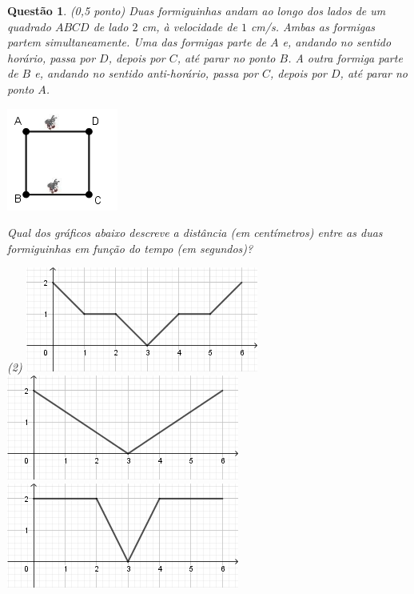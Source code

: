 \documentclass[oneside,a4paper,12pt]{article}
\newcommand{\negrito}[1]{\mbox{\boldmath{$#1$}}}
\theoremstyle{Colorido}
\theoremstyle{solu}
\theoremstyle{dotlessP}
\newtheorem{sol}{Questão}
\begin{document}
	\begin{sol}
\textit{(0,5 ponto)} \newline \newline Duas formiguinhas andam ao longo dos lados de um quadrado $ABCD$ de lado $2$ cm, à velocidade de $1$ cm/s. Ambas as formigas partem simultaneamente. Uma das formigas parte de $A$ e, andando no sentido horário, passa por $D$, depois por $C$, até parar no ponto $B$. A outra formiga parte de $B$ e, andando no sentido anti-horário, passa por $C$, depois por $D$, até parar no ponto $A$.
\begin{center}
\includegraphics[scale=3.5]{Provas e Avaliações/arq-01.png}
\end{center}
Qual dos gráficos abaixo descreve a distância (em centímetros) entre as duas formiguinhas em função do tempo (em segundos)?
\begin{tasks}[counter-format={(tsk[a])},label-width=3.6ex, label-format = {\bfseries}, column-sep = {20pt}](2)
\task[\textcolor{blue}{$\negrito{(a)} $}] \includegraphics[scale=2.9]{Provas e Avaliações/arq-02.png}
\task[\textcolor{blue}{$\negrito{(b)} $}] \includegraphics[scale=2.9]{Provas e Avaliações/arq-03.png}
\task[\textcolor{blue}{$\negrito{(c)} $}] \includegraphics[scale=2.9]{Provas e Avaliações/arq-04.png}

\end{tasks}
\end{sol}
\end{document}
